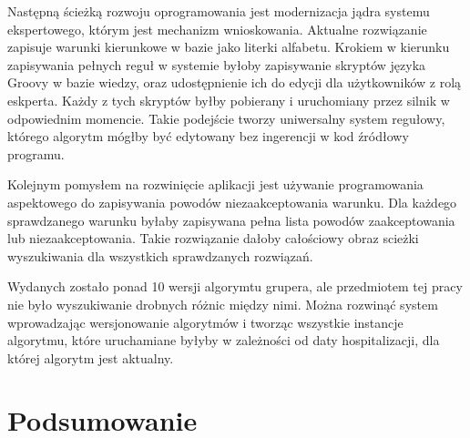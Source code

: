 Następną ścieżką rozwoju oprogramowania jest modernizacja jądra systemu ekspertowego, którym jest mechanizm wnioskowania. Aktualne rozwiązanie zapisuje warunki kierunkowe w bazie jako literki alfabetu. Krokiem w kierunku zapisywania pełnych reguł w systemie byłoby zapisywanie skryptów języka Groovy w bazie wiedzy, oraz udostępnienie ich do edycji dla użytkowników z rolą eskperta. Każdy z tych skryptów byłby pobierany i uruchomiany przez silnik w odpowiednim momencie.
Takie podejście tworzy uniwersalny system regułowy, którego algorytm mógłby być edytowany bez ingerencji w kod źródłowy programu.

Kolejnym pomysłem na rozwinięcie aplikacji jest używanie programowania aspektowego do zapisywania powodów niezaakceptowania warunku.
Dla każdego sprawdzanego warunku byłaby zapisywana pełna lista powodów zaakceptowania lub niezaakceptowania.
Takie rozwiązanie dałoby całościowy obraz scieżki wyszukiwania dla wszystkich sprawdzanych rozwiązań.

Wydanych zostało ponad 10 wersji algorymtu grupera, ale przedmiotem tej pracy nie było wyszukiwanie drobnych różnic między nimi. Można rozwinąć system wprowadzając wersjonowanie algorytmów i tworząc wszystkie instancje algorytmu, które uruchamiane byłyby w zależności od daty hospitalizacji, dla której algorytm jest aktualny.


\section{Podsumowanie}
\label{sec:podsumowanie}

